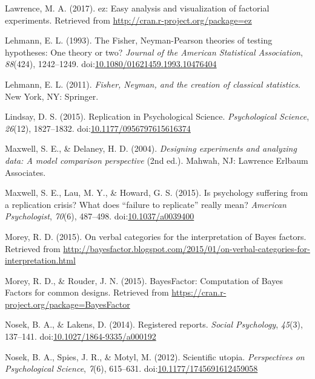 \documentclass[,man, mask]{apa6}
\theoremstyle{definition}
\theoremstyle{definition}
\theoremstyle{definition}
\theoremstyle{remark}
\begin{document}
\hypertarget{ref-Lawrence2017}{}
Lawrence, M. A. (2017). ez: Easy analysis and visualization of factorial
experiments. Retrieved from \url{http://cran.r-project.org/package=ez}

\hypertarget{ref-Lehmann1993}{}
Lehmann, E. L. (1993). The Fisher, Neyman-Pearson theories of testing
hypotheses: One theory or two? \emph{Journal of the American Statistical
Association}, \emph{88}(424), 1242--1249.
doi:\href{https://doi.org/10.1080/01621459.1993.10476404}{10.1080/01621459.1993.10476404}

\hypertarget{ref-Lehmann2011}{}
Lehmann, E. L. (2011). \emph{Fisher, Neyman, and the creation of
classical statistics}. New York, NY: Springer.

\hypertarget{ref-Lindsay2015}{}
Lindsay, D. S. (2015). Replication in Psychological Science.
\emph{Psychological Science}, \emph{26}(12), 1827--1832.
doi:\href{https://doi.org/10.1177/0956797615616374}{10.1177/0956797615616374}

\hypertarget{ref-Maxwell2004}{}
Maxwell, S. E., \& Delaney, H. D. (2004). \emph{Designing experiments
and analyzing data: A model comparison perspective} (2nd ed.). Mahwah,
NJ: Lawrence Erlbaum Associates.

\hypertarget{ref-Maxwell2015}{}
Maxwell, S. E., Lau, M. Y., \& Howard, G. S. (2015). Is psychology
suffering from a replication crisis? What does ``failure to replicate''
really mean? \emph{American Psychologist}, \emph{70}(6), 487--498.
doi:\href{https://doi.org/10.1037/a0039400}{10.1037/a0039400}

\hypertarget{ref-Morey2015c}{}
Morey, R. D. (2015). On verbal categories for the interpretation of
Bayes factors. Retrieved from
\url{http://bayesfactor.blogspot.com/2015/01/on-verbal-categories-for-interpretation.html}

\hypertarget{ref-Morey2015b}{}
Morey, R. D., \& Rouder, J. N. (2015). BayesFactor: Computation of Bayes
Factors for common designs. Retrieved from
\url{https://cran.r-project.org/package=BayesFactor}

\hypertarget{ref-Nosek2014}{}
Nosek, B. A., \& Lakens, D. (2014). Registered reports. \emph{Social
Psychology}, \emph{45}(3), 137--141.
doi:\href{https://doi.org/10.1027/1864-9335/a000192}{10.1027/1864-9335/a000192}

\hypertarget{ref-Nosek2012}{}
Nosek, B. A., Spies, J. R., \& Motyl, M. (2012). Scientific utopia.
\emph{Perspectives on Psychological Science}, \emph{7}(6), 615--631.
doi:\href{https://doi.org/10.1177/1745691612459058}{10.1177/1745691612459058}
\end{document}
